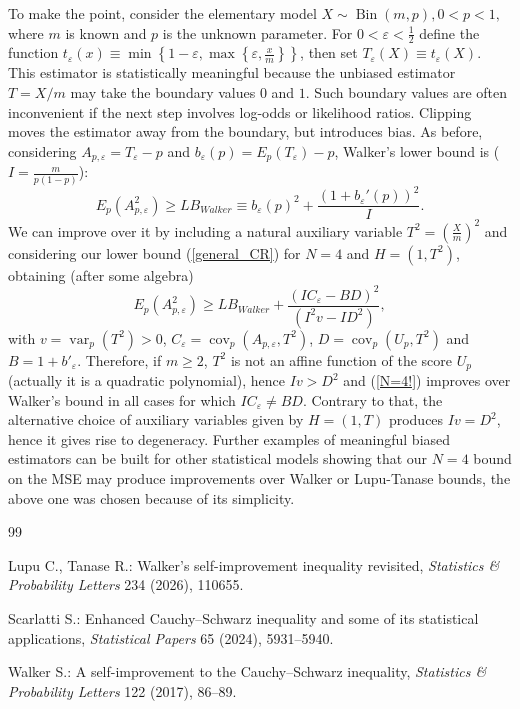 \documentclass[10pt,a4paper]{amsart}
\begin{document}
To make the point, consider the elementary model $ X\sim \operatorname{Bin}(m,p),0<p<1,$ where $m$ is known and $p$ is the unknown parameter. For $0<\varepsilon<\frac1{2}$ define the function $t_\varepsilon(x)\equiv \min\left\{1-\varepsilon,\max\left\{\varepsilon,\frac{x}{m}\right\}\right\}$,
then set $T_\varepsilon(X)\equiv t_\varepsilon(X)$. This estimator is statistically meaningful because the unbiased estimator
$T=X/m$ may take the boundary values $0$ and $1$. Such boundary values are often inconvenient if the next step involves log-odds or likelihood ratios. Clipping moves the estimator away from the boundary, but introduces bias. As before, considering $A_{p,\varepsilon}=T_{\varepsilon}-p$ and $b_{\varepsilon}(p)=E_p(T_{\varepsilon})-p$, Walker's lower bound is ($I=\frac{m}{p(1-p)}$):
$$
E_p(A_{p,\varepsilon}^2)
\geq
LB_{Walker}\equiv b_\varepsilon(p)^2
+
\frac{(1+b_\varepsilon'(p))^2}{I}.
$$
We can improve over it by including a natural auxiliary variable $T^2=(\frac{X}{m})^2$ and considering our lower bound (\ref{general_CR}) for $N=4$ and $H=(1,T^2)$, obtaining (after some algebra)
\begin{equation}\label{N=4!}
E_p(A_{p,\varepsilon}^2)\geq LB_{Walker}+
\frac{(I C_\varepsilon-BD)^2}{(I^2v-ID^2)},
\end{equation}
with $v=\operatorname{var}_p(T^2)>0$, $C_{\varepsilon}=\operatorname{cov}_p(A_{p,\varepsilon},T^2)$, $D=\operatorname{cov}_p(U_{p},T^2)$ and $B=1+b'_{\varepsilon}$. Therefore, if $m\geq 2$, $T^2$ is not an affine function of the score $U_p$ (actually it is a quadratic polynomial),  hence $Iv>D^2$ and (\ref{N=4!}) improves over Walker's bound in all cases for which $I C_\varepsilon\neq BD$. Contrary to that, the alternative choice of auxiliary variables given by $H=(1,T)$ produces $Iv=D^2$,  hence it gives rise to degeneracy. Further examples of meaningful biased estimators can be built  for other statistical models showing that our $N=4$ bound on the MSE may produce improvements over Walker or Lupu-Tanase bounds, the above one was chosen because of its simplicity.

\begin{thebibliography}{99}

Lupu C., Tanase R.:
Walker’s self-improvement inequality revisited,
\emph{Statistics \& Probability Letters} 234 (2026), 110655.

Scarlatti S.:
Enhanced Cauchy--Schwarz inequality and some of its statistical applications,
\emph{Statistical Papers} 65 (2024), 5931--5940.

Walker S.:
A self-improvement to the Cauchy--Schwarz inequality,
\emph{Statistics \& Probability Letters} 122 (2017), 86--89.

\end{thebibliography}
\end{document}

